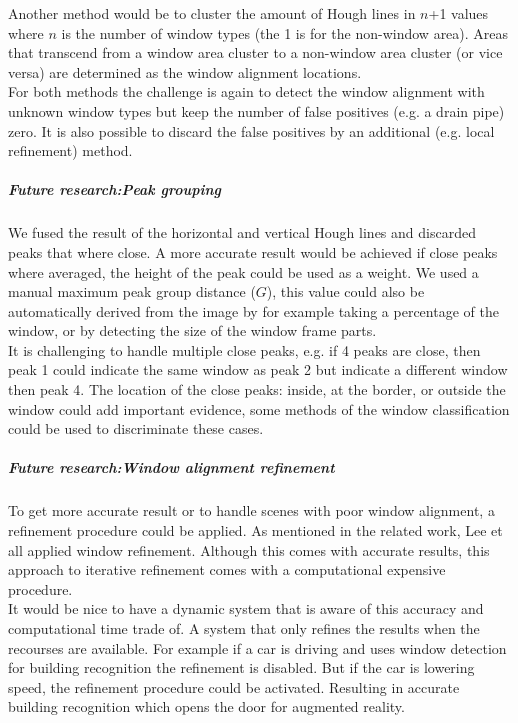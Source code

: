 Another method would be to cluster the amount of Hough lines in $n$+1 values
where $n$ is the number of window types (the 1 is for the non-window area).
Areas that transcend from a window area cluster to a non-window area cluster
(or vice versa) are determined as the window alignment locations.\\

For both methods the challenge is again to detect the window alignment with
unknown window types but keep the number of false positives (e.g. a drain pipe)
zero. It is also possible to discard the false positives by an additional (e.g.
local refinement) method.

\subparagraph{Future research:Peak grouping}
We fused the result of the horizontal and vertical Hough lines and discarded
peaks that where close.  A more accurate result would be achieved if close peaks
where averaged, the height of the peak could be used as a weight.  We used a
manual maximum peak group distance ($G$), this value could also be automatically
derived from the image by for example taking a percentage of the window, or by
detecting the size of the window frame parts.\\ It is challenging to handle
multiple close peaks, e.g. if 4 peaks are close, then peak 1 could indicate the
same window as peak 2 but indicate a different window then peak 4. The location
of the close peaks: inside, at the border, or outside the window could add
important evidence, some methods of the window classification could be used to
discriminate these cases.

\subparagraph{Future research:Window alignment refinement}
To get more accurate result or to handle scenes with poor window alignment, a
refinement procedure could be applied.  As mentioned in the related work, Lee et
all \cite{Lee_extraction} applied window refinement.  Although this comes with
accurate results, this approach to iterative refinement comes with a
computational expensive procedure.  \\

It would be nice to have a dynamic system that is aware of this
accuracy and computational time trade of. A system that only refines the results
when the recourses are available.  For example if a car is driving and uses
window detection for building recognition the refinement is disabled.  But if
the car is lowering speed, the refinement procedure could be activated.
Resulting in accurate building recognition which opens the door for augmented
reality.\\

